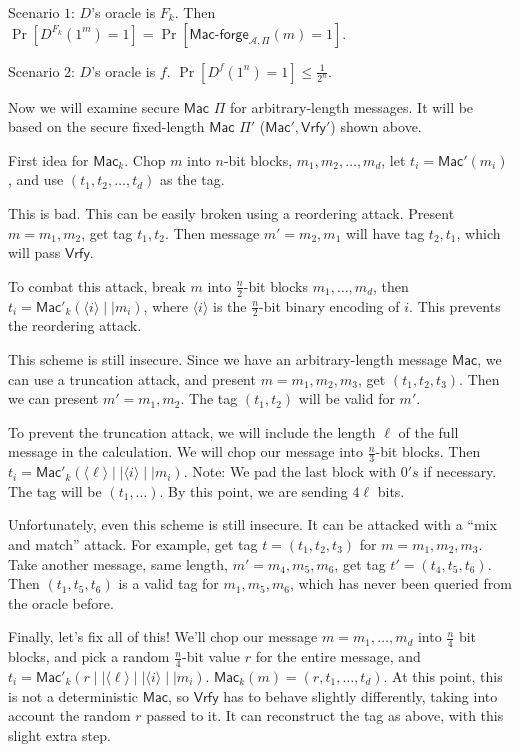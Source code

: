 \documentclass[12pt]{article}
\newcommand{\AAA}{\mathcal{A}}
\newcommand{\Mac}{\mathsf{Mac}}
\newcommand{\Macf}{\mathsf{Mac\text{-}forge}}
\newcommand{\Vrfy}{\mathsf{Vrfy}}
\newcommand{\ang}[1]{\langle#1\rangle}
\begin{document}
Scenario $1$: $D$'s oracle is $F_k$. Then $\Pr[D^{F_k}(1^m)=1]=\Pr[\Macf_{\AAA,\Pi}(m)=1]$.

Scenario $2$: $D$'s oracle is $f$. $\Pr[D^{f}(1^n)=1]\leq\frac{1}{2^n}$.

Now we will examine secure $\Mac$ $\Pi$ for arbitrary-length messages. It will be based on the secure fixed-length $\Mac$ $\Pi'$ ($\Mac',\Vrfy'$) shown above.

First idea for $\Mac_k$. Chop $m$ into $n$-bit blocks, $m_1,m_2,\dots,m_d$, let $t_i=\Mac'(m_i)$, and use $(t_1,t_2,\dots,t_d)$ as the tag.

This is bad. This can be easily broken using a reordering attack. Present $m=m_1,m_2$, get tag $t_1,t_2$. Then message $m'=m_2,m_1$ will have tag $t_2,t_1$, which will pass $\Vrfy$.

To combat this attack, break $m$ into $\frac{n}{2}$-bit blocks $m_1,\dots,m_d$, then $t_i=\Mac'_k(\ang{i}\mid\mid m_i)$, where $\ang{i}$ is the $\frac{n}{2}$-bit binary encoding of $i$. This prevents the reordering attack.

This scheme is still insecure. Since we have an arbitrary-length message $\Mac$, we can use a truncation attack, and present $m=m_1,m_2,m_3$, get $(t_1,t_2,t_3)$. Then we can present $m'=m_1,m_2$. The tag $(t_1,t_2)$ will be valid for $m'$.

To prevent the truncation attack, we will include the length $\ell$ of the full message in the calculation. We will chop our message into $\frac{n}{3}$-bit blocks. Then $t_i=\Mac'_k(\ang{\ell}\mid\mid\ang{i}\mid\mid m_i)$. Note: We pad the last block with $0's$ if necessary. The tag will be $(t_1,\dots)$. By this point, we are sending $4\ell$ bits.

Unfortunately, even this scheme is still insecure. It can be attacked with a ``mix and match'' attack. For example, get tag $t=(t_1,t_2,t_3)$ for $m=m_1,m_2,m_3$. Take another message, same length, $m'=m_4,m_5,m_6$, get tag $t'=(t_4,t_5,t_6)$. Then $(t_1,t_5,t_6)$ is a valid tag for $m_1,m_5,m_6$, which has never been queried from the oracle before.

Finally, let's fix all of this! We'll chop our message $m=m_1,\dots,m_d$ into $\frac{n}{4}$ bit blocks, and pick a random $\frac{n}{4}$-bit value $r$ for the entire message, and $t_i=\Mac'_k(r\mid\mid\ang{\ell}\mid\mid\ang{i}\mid\mid m_i)$. $\Mac_k(m)=(r,t_1,\dots,t_d)$. At this point, this is not a deterministic $\Mac$, so $\Vrfy$ has to behave slightly differently, taking into account the random $r$ passed to it. It can reconstruct the tag as above, with this slight extra step.
\end{document}
